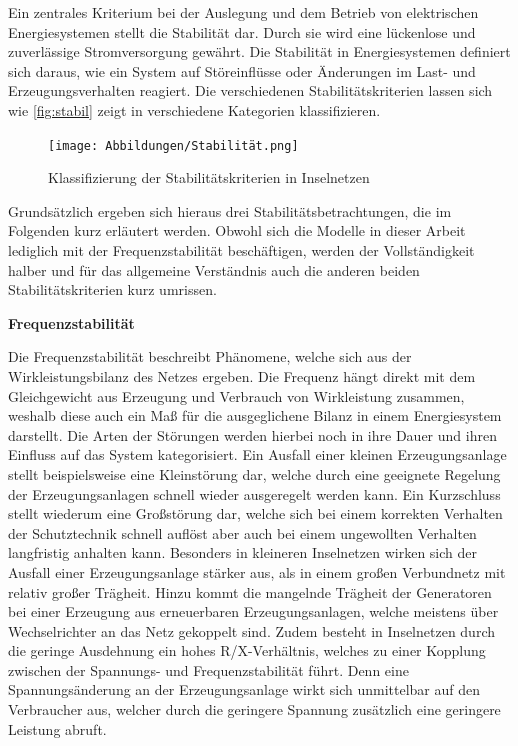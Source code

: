 Ein zentrales Kriterium bei der Auslegung und dem Betrieb von elektrischen Energiesystemen stellt die Stabilität dar. Durch sie wird eine lückenlose und zuverlässige Stromversorgung gewährt. Die Stabilität in Energiesystemen definiert sich daraus, wie ein System auf Störeinflüsse oder Änderungen im Last- und Erzeugungsverhalten reagiert. Die verschiedenen Stabilitätskriterien lassen sich wie  \autoref{fig:stabil} zeigt in verschiedene Kategorien klassifizieren. 

\begin{figure}[H]
	\centering
	\texttt{[image: Abbildungen/Stabilität.png]}
	\caption{Klassifizierung der Stabilitätskriterien in Inselnetzen \cite{Willenberg2021}}
	\label{fig:stabil}
\end{figure}

Grundsätzlich ergeben sich hieraus drei Stabilitätsbetrachtungen, die im Folgenden kurz erläutert werden. Obwohl sich die Modelle in dieser Arbeit lediglich mit der Frequenzstabilität beschäftigen, werden der Vollständigkeit halber und für das allgemeine Verständnis auch die anderen beiden Stabilitätskriterien kurz umrissen.

\textbf{Frequenzstabilität}

Die Frequenzstabilität beschreibt Phänomene, welche sich aus der Wirkleistungsbilanz des Netzes ergeben. Die Frequenz hängt direkt mit dem Gleichgewicht aus Erzeugung und Verbrauch von Wirkleistung zusammen, weshalb diese auch ein Maß für die ausgeglichene Bilanz in einem Energiesystem darstellt. Die Arten der Störungen werden hierbei noch in ihre Dauer und ihren Einfluss auf das System kategorisiert. Ein Ausfall einer kleinen Erzeugungsanlage stellt beispielsweise eine Kleinstörung dar, welche durch eine geeignete Regelung der Erzeugungsanlagen schnell wieder ausgeregelt werden kann. Ein Kurzschluss stellt wiederum eine Großstörung dar, welche sich bei einem korrekten Verhalten der Schutztechnik schnell auflöst aber auch bei einem ungewollten Verhalten langfristig anhalten kann. Besonders in kleineren Inselnetzen wirken sich der Ausfall einer Erzeugungsanlage stärker aus, als in einem großen Verbundnetz mit relativ großer Trägheit. Hinzu kommt die mangelnde Trägheit der Generatoren bei einer Erzeugung aus erneuerbaren Erzeugungsanlagen, welche meistens über Wechselrichter an das Netz gekoppelt sind. \cite{Simulationsmethode} Zudem besteht in Inselnetzen durch die geringe Ausdehnung ein hohes R/X-Verhältnis, welches zu einer Kopplung zwischen der Spannungs- und Frequenzstabilität führt. Denn eine Spannungsänderung an der Erzeugungsanlage wirkt sich unmittelbar auf den Verbraucher aus, welcher durch die geringere Spannung zusätzlich eine geringere Leistung abruft. \cite{Willenberg2021}

